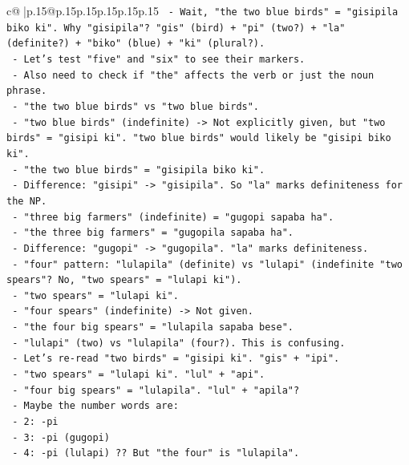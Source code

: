 \documentclass{article}
\begin{document}
{\begin{supertabular}{c@{$\;$}|p{.15\linewidth}@{}p{.15\linewidth}p{.15\linewidth}p{.15\linewidth}p{.15\linewidth}p{.15\linewidth}}
{{{\texttt{   {-} Wait, "the two blue birds" = "gisipila biko ki". Why "gisipila"? "gis" (bird) + "pi" (two?) + "la" (definite?) + "biko" (blue) + "ki" (plural?).} \\
\texttt{   {-} Let's test "five" and "six" to see their markers.} \\
\texttt{   {-} Also need to check if "the" affects the verb or just the noun phrase.} \\
\texttt{   {-} "the two blue birds" vs "two blue birds".} \\
\texttt{     {-} "two blue birds" (indefinite) {-}> Not explicitly given, but "two birds" = "gisipi ki". "two blue birds" would likely be "gisipi biko ki".} \\
\texttt{     {-} "the two blue birds" = "gisipila biko ki".} \\
\texttt{     {-} Difference: "gisipi" {-}> "gisipila". So "la" marks definiteness for the NP.} \\
\texttt{   {-} "three big farmers" (indefinite) = "gugopi sapaba ha".} \\
\texttt{   {-} "the three big farmers" = "gugopila sapaba ha".} \\
\texttt{     {-} Difference: "gugopi" {-}> "gugopila". "la" marks definiteness.} \\
\texttt{   {-} "four" pattern: "lulapila" (definite) vs "lulapi" (indefinite "two spears"? No, "two spears" = "lulapi ki").} \\
\texttt{     {-} "two spears" = "lulapi ki".} \\
\texttt{     {-} "four spears" (indefinite) {-}> Not given.} \\
\texttt{     {-} "the four big spears" = "lulapila sapaba bese".} \\
\texttt{     {-} "lulapi" (two) vs "lulapila" (four?). This is confusing.} \\
\texttt{     {-} Let's re{-}read "two birds" = "gisipi ki". "gis" + "ipi".} \\
\texttt{     {-} "two spears" = "lulapi ki". "lul" + "api".} \\
\texttt{     {-} "four big spears" = "lulapila". "lul" + "apila"?} \\
\texttt{     {-} Maybe the number words are:} \\
\texttt{       {-} 2: {-}pi} \\
\texttt{       {-} 3: {-}pi (gugopi)} \\
\texttt{       {-} 4: {-}pi (lulapi) ?? But "the four" is "lulapila".} \\
}}}
\end{supertabular}}
\end{document}
